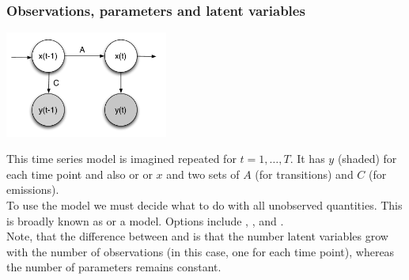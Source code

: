 \begin{frame}
\frametitle{Observations, parameters and latent variables}

\centerline{\includegraphics[width=0.4\textwidth]{d1.pdf}}

This time series model is imagined repeated for $t=1,\ldots,T$. It has  $y$ (shaded) for each time point and also  or  or  $x$ and two sets of  $A$ (for transitions) and $C$ (for emissions).\\[1ex]

To use the model we must decide what to do with all unobserved quantities. This is
broadly known as  or  a model. Options include , ,  and .\\[1ex]

Note, that the difference between  and  is that the number latent variables grow with the number of observations (in this case, one for each time point), whereas the number of parameters remains constant.
\end{frame}


